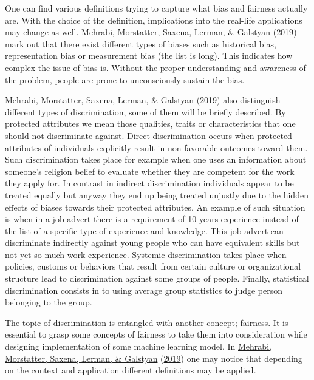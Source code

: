 \documentclass[
  12pt,
]{book}
\begin{document}
One can find various definitions trying to capture what bias and fairness actually are. With the choice of the definition, implications into the real-life applications may change as well. \protect\hyperlink{ref-Mehrabi2019Survey}{Mehrabi, Morstatter, Saxena, Lerman, \& Galstyan} (\protect\hyperlink{ref-Mehrabi2019Survey}{2019}) mark out that there exist different types of biases such as historical bias, representation bias or measurement bias (the list is long). This indicates how complex the issue of bias is. Without the proper understanding and awareness of the problem, people are prone to unconsciously sustain the bias.

\protect\hyperlink{ref-Mehrabi2019Survey}{Mehrabi, Morstatter, Saxena, Lerman, \& Galstyan} (\protect\hyperlink{ref-Mehrabi2019Survey}{2019}) also distinguish different types of discrimination, some of them will be briefly described. By protected attributes we mean those qualities, traits or characteristics that one should not discriminate against.
Direct discrimination occurs when protected attributes of individuals explicitly result in non-favorable outcomes toward them. Such discrimination takes place for example when one uses an information about someone's religion belief to evaluate whether they are competent for the work they apply for. In contrast in indirect discrimination individuals appear to be treated equally but anyway they end up being treated unjustly due to the hidden effects of biases towards their protected attributes. An example of such situation is when in a job advert there is a requirement of 10 years experience instead of the list of a specific type of experience and knowledge. This job advert can discriminate indirectly against young people who can have equivalent skills but not yet so much work experience. Systemic discrimination takes place when policies, customs or behaviors that result from certain culture or organizational structure lead to discrimination against some groups of people. Finally, statistical discrimination consists in to using
average group statistics to judge person belonging to the group.

The topic of discrimination is entangled with another concept; fairness. It is essential to grasp some concepts of fairness to take them into
consideration while designing implementation of some machine learning model. In \protect\hyperlink{ref-Mehrabi2019Survey}{Mehrabi, Morstatter, Saxena, Lerman, \& Galstyan} (\protect\hyperlink{ref-Mehrabi2019Survey}{2019}) one may notice that depending on the context and application different definitions may be applied.
\end{document}
